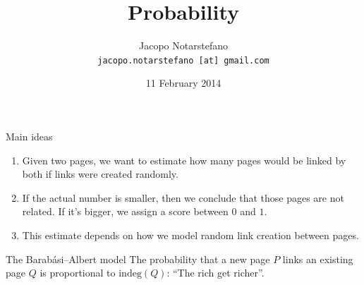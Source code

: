 \documentclass[12pt]{beamer}
\title{Probability}
\author[Jacopo Notarstefano]{
    Jacopo Notarstefano\\
    \texttt{jacopo.notarstefano [at] gmail.com}
}
\date{11 February 2014}
\begin{document}
    \begin{frame}[plain]
        \titlepage
    \end{frame}

    \begin{frame}{Main ideas}
        \begin{enumerate}
            \item Given two pages, we want to estimate how many pages would be linked
            by both if links were created randomly.
            \item If the actual number is smaller, then we conclude that those pages
            are not related. If it's bigger, we assign a score between \(0\) and \(1\).
            \item This estimate depends on how we model random link creation between
            pages.
        \end{enumerate}
    \end{frame}

    \begin{frame}{The Barabási–Albert model}
        The probability that a new page \(P\) links an existing page \(Q\) is
        proportional to \(\text{indeg}(Q)\): ``The rich get richer''.
        \begin{figure}
        \end{figure}
    \end{frame}
\end{document}

